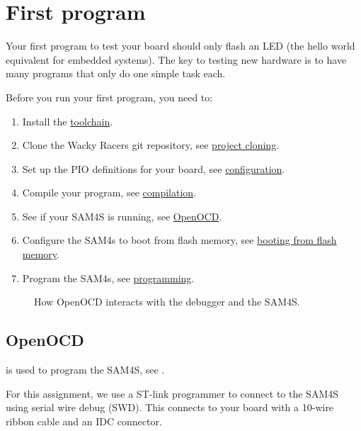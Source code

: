 \chapter{First program}
\label{first-program}

Your first program to test your board should only flash an LED (the
hello world equivalent for embedded systems). The key to testing new
hardware is to have many programs that only do one simple task each.

Before you run your first program, you need to:
%
\begin{enumerate}
\item Install the \hyperref[toolchain]{toolchain}.

\item Clone the Wacky Racers git repository, see
  \hyperref[project-cloning]{project cloning}.

\item Set up the PIO definitions for your board, see
  \hyperref[configuration]{configuration}.

\item Compile your program, see \hyperref[compilation]{compilation}.

\item See if your SAM4S is running, see \hyperref[openocd]{OpenOCD}.

\item Configure the SAM4s to boot from flash memory, see
  \hyperref[booting-from-flash-memory]{booting from flash memory}.

\item Program the SAM4s, see \hyperref[programming]{programming}.
\end{enumerate}


\begin{figure}

\caption{How OpenOCD interacts with the debugger and the SAM4S.}
\label{fig:openocd diagram}
\end{figure}


\section{OpenOCD}
\label{openocd}

 is used to program the SAM4S, see .

For this assignment, we use a ST-link programmer to connect to the
SAM4S using serial wire debug (SWD). This connects to your board with
a 10-wire ribbon cable and an IDC connector.

